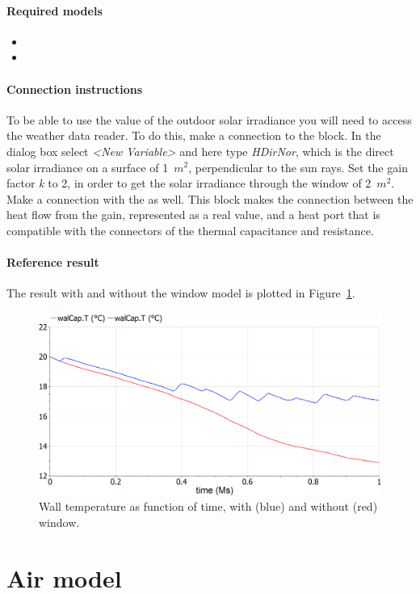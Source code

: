 \documentclass[10pt,a4paper]{article}
\begin{document}
\paragraph{Required models}
\begin{itemize}
\item {}
\item {}
\end{itemize}

\paragraph{Connection instructions}
To be able to use the value of the outdoor solar irradiance you will need to access the weather data reader. To do this, make a connection to the  block. In the dialog box select \textit{\textless New Variable\textgreater} and here type \textit{HDirNor}, which is the direct solar irradiance on a surface of 1~$m^2$, perpendicular to the sun rays. Set the gain factor \textit{k} to 2, in order to get the solar irradiance through the window of 2~$m^2$. Make a connection with the  as well. This block makes the connection between the heat flow from the gain, represented as a real value, and a heat port that is compatible with the connectors of the thermal capacitance and resistance. 

\paragraph{Reference result}
The result with and without the window model is plotted in Figure~\ref{fig:res2}.
\begin{figure}[h]
\centering
\includegraphics[width=0.6\columnwidth]{img/result2.png}
\caption{Wall temperature as function of time, with (blue) and without (red) window.}
\label{fig:res2}
\end{figure}



\newpage
\section{Air model}
\end{document}
